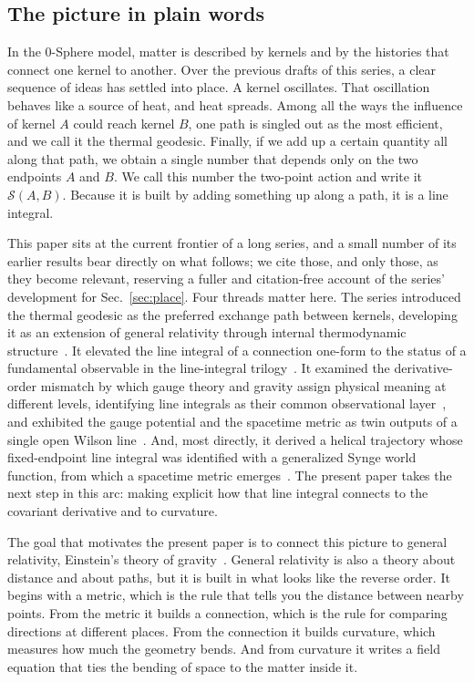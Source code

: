 \documentclass[%
 reprint, amsmath,amssymb, aps, prb, ]{revtex4-2}
\numberwithin{equation}{section}
\begin{document}
\subsection{The picture in plain words}

In the 0-Sphere model, matter is described by kernels and by the histories that connect one kernel to another. Over the previous drafts of this series, a clear sequence of ideas has settled into place. A kernel oscillates. That oscillation behaves like a source of heat, and heat spreads. Among all the ways the influence of kernel $A$ could reach kernel $B$, one path is singled out as the most efficient, and we call it the thermal geodesic. Finally, if we add up a certain quantity all along that path, we obtain a single number that depends only on the two endpoints $A$ and $B$. We call this number the two-point action and write it $\mathcal{S}(A,B)$. Because it is built by adding something up along a path, it is a line integral.

This paper sits at the current frontier of a long series, and a small number of its earlier results bear directly on what follows; we cite those, and only those, as they become relevant, reserving a fuller and citation-free account of the series' development for Sec.~\ref{sec:place}. Four threads matter here. The series introduced the thermal geodesic as the preferred exchange path between kernels, developing it as an extension of general relativity through internal thermodynamic structure~\cite{hanamura24,hanamura29}. It elevated the line integral of a connection one-form to the status of a fundamental observable in the line-integral trilogy~\cite{hanamura29,hanamura30,hanamura31}. It examined the derivative-order mismatch by which gauge theory and gravity assign physical meaning at different levels, identifying line integrals as their common observational layer~\cite{hanamura40,hanamura41}, and exhibited the gauge potential and the spacetime metric as twin outputs of a single open Wilson line~\cite{hanamura55}. And, most directly, it derived a helical trajectory whose fixed-endpoint line integral was identified with a generalized Synge world function, from which a spacetime metric emerges~\cite{hanamura51}. The present paper takes the next step in this arc: making explicit how that line integral connects to the covariant derivative and to curvature.

The goal that motivates the present paper is to connect this picture to general relativity, Einstein's theory of gravity~\cite{MTW1973}. General relativity is also a theory about distance and about paths, but it is built in what looks like the reverse order. It begins with a metric, which is the rule that tells you the distance between nearby points. From the metric it builds a connection, which is the rule for comparing directions at different places. From the connection it builds curvature, which measures how much the geometry bends. And from curvature it writes a field equation that ties the bending of space to the matter inside it.
\end{document}
